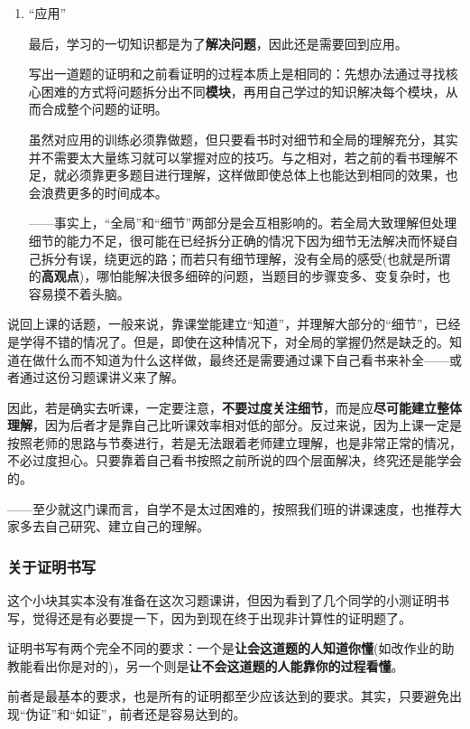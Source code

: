 \documentclass[a4paper,UTF8,fontset=windows]{ctexart}
\begin{document}
\begin{enumerate}
    \item ``应用''
    
    最后，学习的一切知识都是为了\textbf{解决问题}，因此还是需要回到应用。

    写出一道题的证明和之前看证明的过程本质上是相同的：先想办法通过寻找核心困难的方式将问题拆分出不同\textbf{模块}，再用自己学过的知识解决每个模块，从而合成整个问题的证明。

    虽然对应用的训练必须靠做题，但只要看书时对细节和全局的理解充分，其实并不需要太大量练习就可以掌握对应的技巧。与之相对，若之前的看书理解不足，就必须靠更多题目进行理解，这样做即使总体上也能达到相同的效果，也会浪费更多的时间成本。

    ——事实上，``全局''和``细节''两部分是会互相影响的。若全局大致理解但处理细节的能力不足，很可能在已经拆分正确的情况下因为细节无法解决而怀疑自己拆分有误，绕更远的路；而若只有细节理解，没有全局的感受(也就是所谓的\textbf{高观点})，哪怕能解决很多细碎的问题，当题目的步骤变多、变复杂时，也容易摸不着头脑。
\end{enumerate}

说回上课的话题，一般来说，靠课堂能建立``知道''，并理解大部分的``细节''，已经是学得不错的情况了。但是，即使在这种情况下，对全局的掌握仍然是缺乏的。知道在做什么而不知道为什么这样做，最终还是需要通过课下自己看书来补全——或者通过这份习题课讲义来了解。

因此，若是确实去听课，一定要注意，\textbf{不要过度关注细节}，而是应\textbf{尽可能建立整体理解}，因为后者才是靠自己比听课效率相对低的部分。反过来说，因为上课一定是按照老师的思路与节奏进行，若是无法跟着老师建立理解，也是非常正常的情况，不必过度担心。只要靠着自己看书按照之前所说的四个层面解决，终究还是能学会的。

——至少就这门课而言，自学不是太过困难的，按照我们班的讲课速度，也推荐大家多去自己研究、建立自己的理解。

\subsubsection{关于证明书写}
这个小块其实本没有准备在这次习题课讲，但因为看到了几个同学的小测证明书写，觉得还是有必要提一下，因为到现在终于出现非计算性的证明题了。

证明书写有两个完全不同的要求：一个是\textbf{让会这道题的人知道你懂}(如改作业的助教能看出你是对的)，另一个则是\textbf{让不会这道题的人能靠你的过程看懂}。

前者是最基本的要求，也是所有的证明都至少应该达到的要求。其实，只要避免出现``伪证''和``如证''，前者还是容易达到的。
\end{document}
